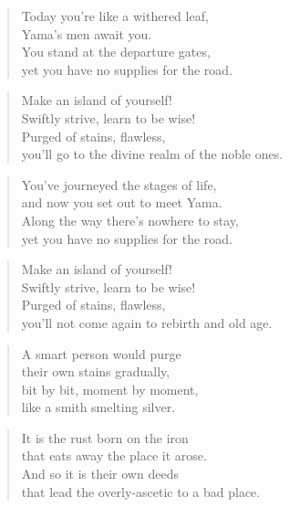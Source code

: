 \documentclass[12pt,openany]{book}%
\begin{document}
\begin{verse}%
Today you’re like a withered leaf, \\
Yama’s men await you. \\
You stand at the departure gates, \\
yet you have no supplies for the road. 

%
\end{verse}

\begin{verse}%
Make an island of yourself! \\
Swiftly strive, learn to be wise! \\
Purged of stains, flawless, \\
you’ll go to the divine realm of the noble ones. 

%
\end{verse}

\begin{verse}%
You’ve journeyed the stages of life, \\
and now you set out to meet Yama. \\
Along the way there’s nowhere to stay, \\
yet you have no supplies for the road. 

%
\end{verse}

\begin{verse}%
Make an island of yourself! \\
Swiftly strive, learn to be wise! \\
Purged of stains, flawless, \\
you’ll not come again to rebirth and old age. 

%
\end{verse}

\begin{verse}%
A smart person would purge \\
their own stains gradually, \\
bit by bit, moment by moment, \\
like a smith smelting silver. 

%
\end{verse}

\begin{verse}%
It is the rust born on the iron \\
that eats away the place it arose. \\
And so it is their own deeds \\
that lead the overly-ascetic to a bad place. 

%
\end{verse}
\end{document}
